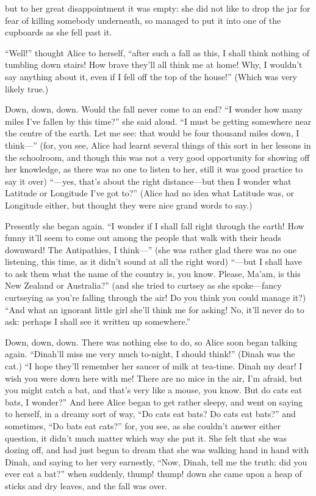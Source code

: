 \documentclass[10pt]{article}
\begin{document}
but to her great disappointment it was empty: she did not like to drop the jar for fear of killing somebody underneath, so managed to put it into one of the cupboards as she fell past it.

``Well!'' thought Alice to herself, ``after such a fall as this, I shall think nothing of tumbling down stairs! How brave they'll all think me at home! Why, I wouldn't say anything about it, even if I fell off the top of the house!'' (Which was very likely true.)

Down, down, down. Would the fall never come to an end? ``I wonder how many miles I've fallen by this time?'' she said aloud. ``I must be getting somewhere near the centre of the earth. Let me see: that would be four thousand miles down, I think—'' (for, you see, Alice had learnt several things of this sort in her lessons in the schoolroom, and though this was not a very good opportunity for showing off her knowledge, as there was no one to listen to her, still it was good practice to say it over) ``—yes, that's about the right distance—but then I wonder what Latitude or Longitude I've got to?'' (Alice had no idea what Latitude was, or Longitude either, but thought they were nice grand words to say.)

Presently she began again. ``I wonder if I shall fall right through the earth! How funny it'll seem to come out among the people that walk with their heads downward! The Antipathies, I think—'' (she was rather glad there was no one listening, this time, as it didn't sound at all the right word) ``—but I shall have to ask them what the name of the country is, you know. Please, Ma'am, is this New Zealand or Australia?'' (and she tried to curtsey as she spoke—fancy curtseying as you're falling through the air! Do you think you could manage it?) ``And what an ignorant little girl she'll think me for asking! No, it'll never do to ask: perhaps I shall see it written up somewhere.''

Down, down, down. There was nothing else to do, so Alice soon began talking again. ``Dinah'll miss me very much to-night, I should think!'' (Dinah was the cat.) ``I hope they'll remember her saucer of milk at tea-time. Dinah my dear! I wish you were down here with me! There are no mice in the air, I'm afraid, but you might catch a bat, and that's very like a mouse, you know. But do cats eat bats, I wonder?'' And here Alice began to get rather sleepy, and went on saying to herself, in a dreamy sort of way, ``Do cats eat bats? Do cats eat bats?'' and sometimes, ``Do bats eat cats?'' for, you see, as she couldn't answer either question, it didn't much matter which way she put it. She felt that she was dozing off, and had just begun to dream that she was walking hand in hand with Dinah, and saying to her very earnestly, ``Now, Dinah, tell me the truth: did you ever eat a bat?'' when suddenly, thump! thump! down she came upon a heap of sticks and dry leaves, and the fall was over.
\end{document}
